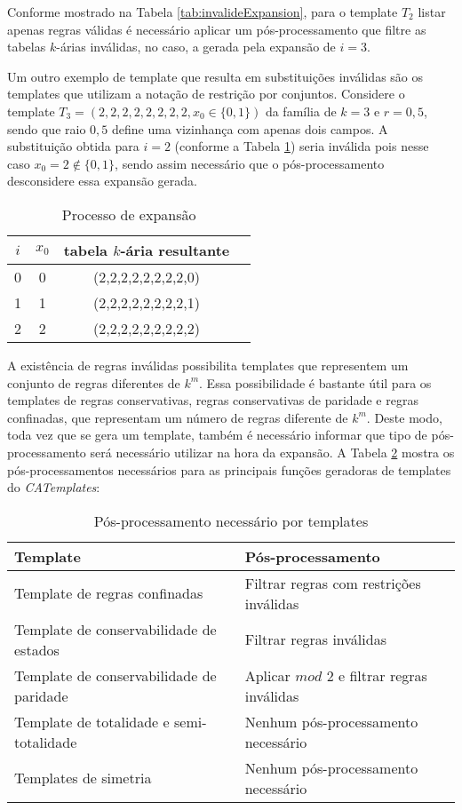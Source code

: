 Conforme mostrado na Tabela \ref{tab:invalideExpansion}, para o template $T_2$ listar apenas regras válidas é necessário aplicar um pós-processamento que filtre as tabelas $k$-árias inválidas, no caso, a gerada pela expansão de $i = 3$. 

Um outro exemplo de template que resulta em substituições inválidas são os templates que utilizam a notação de restrição por conjuntos. Considere o template $T_3 = (2,2,2,2,2,2,2,2,x_0\in \{0,1\})$ da família de $k=3$ e $r=0{,}5$, sendo que raio $0{,}5$ define uma vizinhança com apenas dois campos. A substituição obtida para $i = 2$ (conforme a Tabela \ref{tab:invalideExpansion2}) seria inválida pois nesse caso $x_0 = 2 \notin \{0,1\}$, sendo assim necessário que o pós-processamento desconsidere essa expansão gerada.
\begin{table}[h!]
\centering
\caption{Processo de expansão}
	\begin{tabular}{cccc}
    \toprule
	$i$ & $x_0$ & tabela $k$-ária resultante \\
    \midrule
	0	&	0	&	(2,2,2,2,2,2,2,2,0)	\\
	1	&	1	&	(2,2,2,2,2,2,2,2,1)	\\
	2	&	2	&	(2,2,2,2,2,2,2,2,2)	\\
    \bottomrule
	\end{tabular}
\label{tab:invalideExpansion2}
\end{table}

A existência de regras inválidas possibilita templates que representem um conjunto de regras diferentes de $k^m$. Essa possibilidade é bastante útil para os templates de regras conservativas, regras conservativas de paridade e regras confinadas, que representam um número de regras diferente de $k^m$. Deste modo, toda vez que se gera um template, também é necessário informar que tipo de pós-processamento será necessário utilizar na hora da expansão. A Tabela \ref{tab:posProcessamento} mostra os pós-processamentos necessários para as principais funções geradoras de templates do \textit{CATemplates}:
\begin{table}[h!]
\centering
\caption{Pós-processamento necessário por templates}
	\begin{tabular}{ll}
    \toprule
	Template & Pós-processamento \\
    \midrule
	Template de regras confinadas 				& Filtrar regras com restrições inválidas	\\
	Template de conservabilidade de estados		& Filtrar regras inválidas						\\
	Template de conservabilidade de paridade 	& Aplicar $mod$ $2$ e filtrar regras inválidas	\\
	Template de totalidade e semi-totalidade 	& Nenhum pós-processamento necessário 				\\
	Templates de simetria		 				& Nenhum pós-processamento necessário 				\\
    \bottomrule
	\end{tabular}
\label{tab:posProcessamento}
\end{table}

